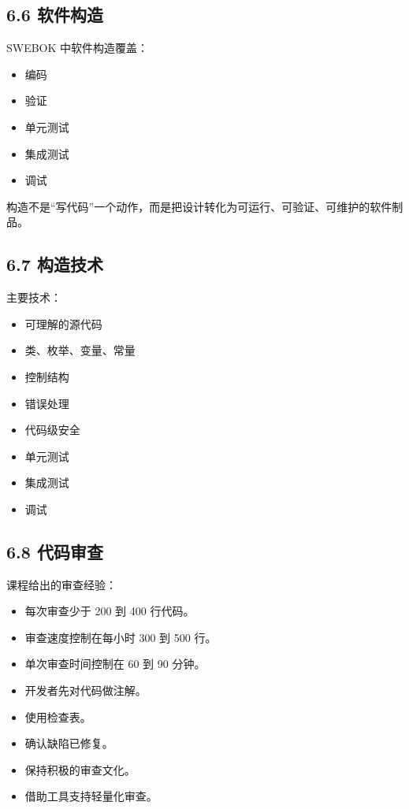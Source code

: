 \documentclass[UTF8,zihao=-4]{ctexart}
\begin{document}
\subsection{6.6 软件构造}

SWEBOK 中软件构造覆盖：

\begin{itemize}
\item 编码
\item 验证
\item 单元测试
\item 集成测试
\item 调试
\end{itemize}

构造不是“写代码”一个动作，而是把设计转化为可运行、可验证、可维护的软件制品。

\subsection{6.7 构造技术}

主要技术：

\begin{itemize}
\item 可理解的源代码
\item 类、枚举、变量、常量
\item 控制结构
\item 错误处理
\item 代码级安全
\item 单元测试
\item 集成测试
\item 调试
\end{itemize}

\subsection{6.8 代码审查}

课程给出的审查经验：

\begin{itemize}
\item 每次审查少于 200 到 400 行代码。
\item 审查速度控制在每小时 300 到 500 行。
\item 单次审查时间控制在 60 到 90 分钟。
\item 开发者先对代码做注解。
\item 使用检查表。
\item 确认缺陷已修复。
\item 保持积极的审查文化。
\item 借助工具支持轻量化审查。
\end{itemize}
\end{document}
